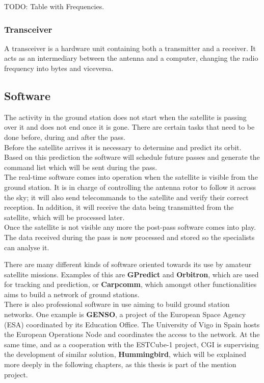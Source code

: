 \begin{table}[h]

\caption{TODO: Table with Frequencies.}
  \label{Table2.5}
\end{table}
\subsubsection{Transceiver}
A transceiver is a hardware unit containing both a transmitter and a receiver. It acts as an intermediary between the antenna and a computer, changing the radio frequency into bytes and viceversa.

\subsection{Software}
The activity in the ground station does not start when the satellite is passing over it and does not end once it is gone. There are certain tasks that need to be done before, during and after the pass.\\

Before the satellite arrives it is necessary to determine and predict its orbit. Based on this prediction the software will schedule future passes and generate the command list which will be sent during the pass.\\

The real-time software comes into operation when the satellite is visible from the ground station. It is in charge of controlling the antenna rotor to follow it across the sky; it will also send telecommands to the satellite and verify their correct reception. In addition, it will receive the data being transmitted from the satellite, which will be processed later.\\

Once the satellite is not visible any more the post-pass software comes into play. The data received during the pass is now processed and stored so the specialists can analyse it.


There are many different kinds of software oriented towards its use by amateur satellite missions. Examples of this are \textbf{GPredict}\cite{GPredict} and \textbf{Orbitron}\cite{Orbitron}, which are used for tracking and prediction, or \textbf{Carpcomm}\cite{Carpcomm}, which amongst other functionalities aims to build a network of ground stations.\\

There is also professional software in use aiming to build ground station networks. One example is \textbf{GENSO}, a project of the European Space Agency (ESA) coordinated by its Education Office. The University of Vigo in Spain hosts the European Operations Node and coordinates the access to the network\cite{GENSO}. At the same time, and as a cooperation with the ESTCube-1 project, CGI is supervising the development of similar solution, \textbf{Hummingbird}\cite{CGI}, which will be explained more deeply in the following chapters, as this thesis is part of the mention project.


